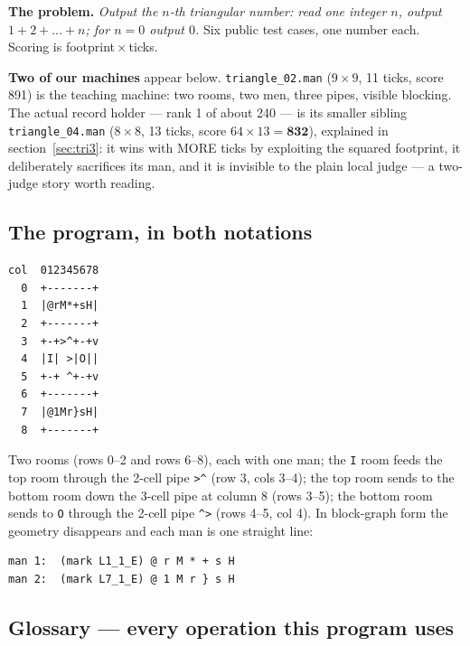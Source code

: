 \documentclass[11pt,a4paper]{article}
\newcommand{\op}[1]{\texttt{#1}}
\begin{document}
\textbf{The problem.} \emph{Output the $n$-th triangular number: read one
integer $n$, output $1+2+\dots+n$; for $n=0$ output $0$.} Six public test
cases, one number each. Scoring is footprint\,$\times$\,ticks.

\textbf{Two of our machines} appear below. \texttt{triangle\_02.man}
($9\times 9$, 11 ticks, score 891) is the teaching machine: two rooms, two
men, three pipes, visible blocking. The actual record holder --- rank 1 of
about 240 --- is its smaller sibling \texttt{triangle\_04.man}
($8\times 8$, 13 ticks, score $64\times13=\textbf{832}$), explained in
section~\ref{sec:tri3}: it wins with MORE ticks by exploiting the squared
footprint, it deliberately sacrifices its man, and it is invisible to the
plain local judge --- a two-judge story worth reading.

\subsection{The program, in both notations}

\begin{verbatim}
col  012345678
  0  +-------+
  1  |@rM*+sH|
  2  +-------+
  3  +-+>^+-+v
  4  |I| >|O||
  5  +-+ ^+-+v
  6  +-------+
  7  |@1Mr}sH|
  8  +-------+
\end{verbatim}

Two rooms (rows 0--2 and rows 6--8), each with one man; the \texttt{I} room
feeds the top room through the 2-cell pipe \op{>}\op{\^{}} (row 3, cols
3--4); the top room sends to the bottom room down the 3-cell pipe at column 8
(rows 3--5); the bottom room sends to \texttt{O} through the 2-cell pipe
\op{\^{}}\op{>} (rows 4--5, col 4). In block-graph form the geometry
disappears and each man is one straight line:

\begin{verbatim}
man 1:  (mark L1_1_E) @ r M * + s H
man 2:  (mark L7_1_E) @ 1 M r } s H
\end{verbatim}

\subsection{Glossary --- every operation this program uses}
\end{document}
